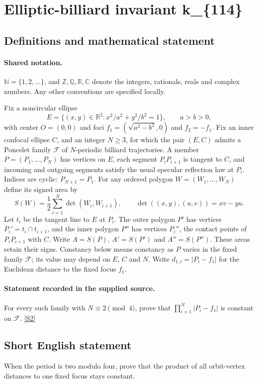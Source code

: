 \documentclass[11pt]{article}
\newcommand{\sref}[2]{\hyperlink{source:#1:#2}{[S#2]}}
\begin{document}
\section{Elliptic-billiard invariant k\_\{114\}}\label{statement}

\subsection{Definitions and mathematical statement}

\paragraph{Shared notation.}$\mathbb N=\{1,2,\ldots\}$, and $\mathbb Z,\mathbb Q,\mathbb R,\mathbb C$ denote the integers, rationals, reals and complex numbers. Any other conventions are specified locally.


Fix a noncircular ellipse
\[
E=\{(x,y)\in\mathbb R^2:x^2/a^2+y^2/b^2=1\},\qquad a>b>0,
\]
with center $O=(0,0)$ and foci $f_1=(\sqrt{a^2-b^2},0)$ and $f_2=-f_1$. Fix an inner confocal ellipse $C$, and an integer $N\geq3$, for which the pair $(E,C)$ admits a Poncelet family $\mathcal F$ of $N$-periodic billiard trajectories. A member $P=(P_1,\ldots,P_N)$ has vertices on $E$, each segment $P_iP_{i+1}$ is tangent to $C$, and incoming and outgoing segments satisfy the usual specular reflection law at $P_i$. Indices are cyclic: $P_{N+1}=P_1$.
For any ordered polygon $W=(W_1,\ldots,W_N)$ define its signed area by
\[
S(W)=\frac12\sum_{i=1}^N\det(W_i,W_{i+1}),\qquad
\det((x,y),(u,v))=xv-yu.
\]
Let $t_i$ be the tangent line to $E$ at $P_i$. The outer polygon $P'$ has vertices $P_i'=t_i\cap t_{i+1}$, and the inner polygon $P''$ has vertices $P_i''$, the contact points of $P_iP_{i+1}$ with $C$. Write $A=S(P)$, $A'=S(P')$ and $A''=S(P'')$. These areas retain their signs. Constancy below means constancy as $P$ varies in the fixed family $\mathcal F$; its value may depend on $E$, $C$ and $N$.
Write $d_{1,i}=|P_i-f_1|$ for the Euclidean distance to the fixed focus $f_1$.
\paragraph{Statement recorded in the supplied source.}
For every such family with $N\equiv2\pmod4$, prove that $\displaystyle\prod_{i=1}^N|P_i-f_1|$ is constant on $\mathcal F$. \sref{statement}{2}
\subsection{Short English statement}
When the period is two modulo four, prove that the product of all orbit-vertex distances to one fixed focus stays constant.
\end{document}
